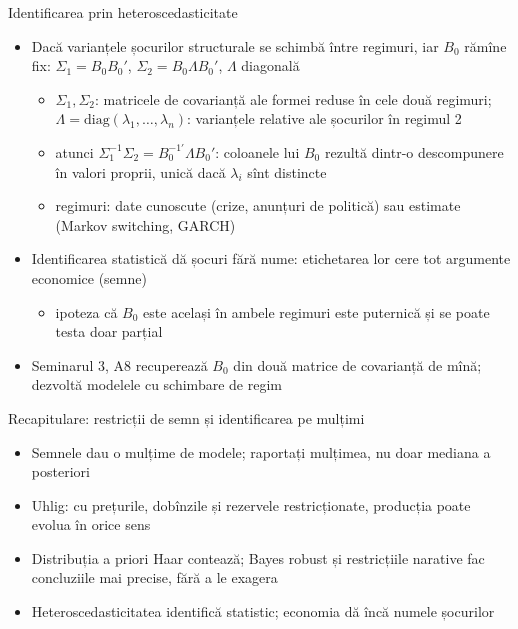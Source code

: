 \begin{frame}{Identificarea prin heteroscedasticitate}
\itemsize{\small}
\begin{itemize}
    \item Dacă varianțele șocurilor structurale se schimbă între regimuri, iar $B_0$ rămîne fix: $\Sigma_1 = B_0B_0'$, $\Sigma_2 = B_0\Lambda B_0'$, $\Lambda$ diagonală 
    \begin{itemize}
        \item $\Sigma_1, \Sigma_2$: matricele de covarianță ale formei reduse în cele două regimuri; $\Lambda = \mathrm{diag}(\lambda_1, \dots, \lambda_n)$: varianțele relative ale șocurilor în regimul 2
        \item atunci $\Sigma_1^{-1}\Sigma_2 = B_0^{-1\prime}\Lambda B_0'$: coloanele lui $B_0$ rezultă dintr-o descompunere în valori proprii, unică dacă $\lambda_i$ sînt distincte
        \item regimuri: date cunoscute (crize, anunțuri de politică) sau estimate (Markov switching, GARCH) 
    \end{itemize}
    \item Identificarea statistică dă șocuri fără nume: etichetarea lor cere tot argumente economice (semne)
    \begin{itemize}
        \item ipoteza că $B_0$ este același în ambele regimuri este puternică și se poate testa doar parțial
    \end{itemize}
    \item Seminarul 3, A8 recuperează $B_0$ din două matrice de covarianță de mînă;  dezvoltă modelele cu schimbare de regim
\end{itemize}
\end{frame}

\begin{frame}{Recapitulare: restricții de semn și identificarea pe mulțimi}
\itemsize{\small}
\begin{itemize}
    \item Semnele dau o mulțime de modele; raportați mulțimea, nu doar mediana a posteriori
    \item Uhlig: cu prețurile, dobînzile și rezervele restricționate, producția poate evolua în orice sens
    \item Distribuția a priori Haar contează; Bayes robust și restricțiile narative fac concluziile mai precise, fără a le exagera
    \item Heteroscedasticitatea identifică statistic; economia dă încă numele șocurilor
\end{itemize}
\end{frame}


